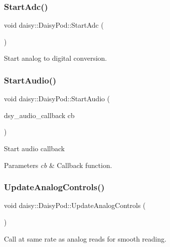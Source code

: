 \subsubsection{\texorpdfstring{Start\+Adc()}{StartAdc()}}
{\footnotesize\ttfamily void daisy\+::\+Daisy\+Pod\+::\+Start\+Adc (\begin{DoxyParamCaption}{ }\end{DoxyParamCaption})}

Start analog to digital conversion. \mbox{\label{classdaisy_1_1_daisy_pod_a765da8887de68b071367d6a88ac54cf2}} 
\subsubsection{\texorpdfstring{Start\+Audio()}{StartAudio()}}
{\footnotesize\ttfamily void daisy\+::\+Daisy\+Pod\+::\+Start\+Audio (\begin{DoxyParamCaption}\item[{dsy\+\_\+audio\+\_\+callback}]{cb }\end{DoxyParamCaption})}

Start audio callback 
\begin{DoxyParams}{Parameters}
{\em cb} & Callback function. \\
\hline
\end{DoxyParams}
\mbox{\label{classdaisy_1_1_daisy_pod_a2c20c15231d0ef1477a9bf3a7868d4d9}} 
\subsubsection{\texorpdfstring{Update\+Analog\+Controls()}{UpdateAnalogControls()}}
{\footnotesize\ttfamily void daisy\+::\+Daisy\+Pod\+::\+Update\+Analog\+Controls (\begin{DoxyParamCaption}{ }\end{DoxyParamCaption})}

Call at same rate as analog reads for smooth reading. \mbox{\label{classdaisy_1_1_daisy_pod_a77da50cfdca4810687adde08a4913135}} 
